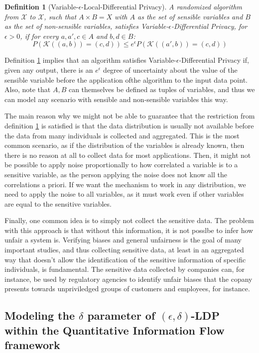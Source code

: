 \documentclass[conference]{IEEEtran}
\newtheorem{definition}{Definition}
\begin{document}
\begin{definition}[Variable-$\epsilon$-Local-Differential Privacy]\label{def:veldp} A randomized algorithm from $\mathcal{X}$ to $\mathcal{X}$, such that $A\times B = X$ with $A$ as the set of sensible variables and $B$ as the set of non-sensible variables, satisfies Variable-$\epsilon$-Differential Privacy, for $\epsilon > 0$, if for every $a, a', c \in A$ and $b, d \in B$:
$$P(\mathcal{K}((a,b)) = (c,d)) \leq e^\epsilon P(\mathcal{K}((a',b)) = (c,d))$$
\end{definition}

Definition \ref{def:veldp} implies that an algorithm satisfies Variable-$\epsilon$-Differential Privacy if, given any output, there is an $e^\epsilon$ degree of uncertainty about the value of the sensible variable before the application ofthe algorithm to the input data point. Also, note that $A,B$ can themselves be defined as tuples of variables, and thus we can model any scenario with sensible and non-sensible variables this way.

The main reason why we might not be able to guarantee that the restriction from definition \ref{def:veldp} is satisfied is that the data distribution is usually not available before the data from many individuals is collected and aggregated. This is the most common scenario, as if the distribution of the variables is already known, then there is no reason at all to collect data for most applications. Then, it might not be possible to apply noise proportionally to how correlated a variable is to a sensitive variable, as the person applying the noise does not know all the correlations a priori. If we want the mechanism to work in any distribution, we need to apply the noise to all variables, as it must work even if other variables are equal to the sensitive variables.

Finally, one common idea is to simply not collect the sensitive data. The problem with this approach is that without this information, it is not posslbe to infer how unfair a system is. Verifying biases and general unfairness is the goal of many important studies, and thus collecting sensitive data, at least in an aggregated way that doesn't allow the identification of the sensitive information of specific individuals, is fundamental. The sensitive data collected by companies can, for instance, be used by regulatory agencies to identify unfair biases that the copany presents towards unpriviledged groups of customers and employees, for instance.

\subsection{Modeling the $\delta$ parameter of $(\epsilon,\delta)$-LDP within the Quantitative Information Flow framework}\label{subsec:ldeltap}
\end{document}
